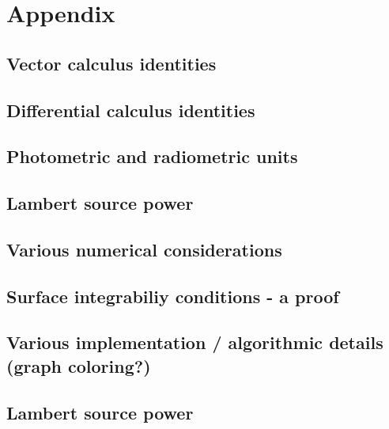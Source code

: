 \chapter{Appendix}
\label{ch:appendix}

\section{Vector calculus identities}

\section{Differential calculus identities}

\section{Photometric and radiometric units}

\section{Lambert source power}

\section{Various numerical considerations}

\section{Surface integrabiliy conditions - a proof}

\section{Various implementation / algorithmic details  (graph coloring?)}


\section*{Lambert source power}

